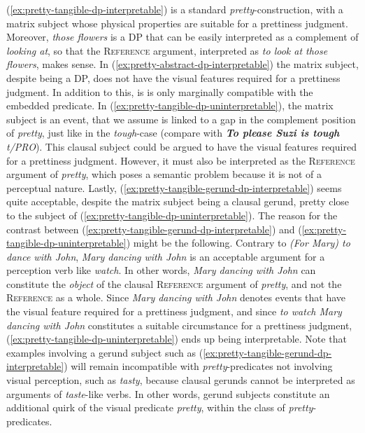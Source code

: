 \documentclass[11pt]{article}
\begin{document}
(\ref{ex:pretty-tangible-dp-interpretable}) is a standard \textit{pretty}-construction, with a matrix subject whose physical properties are suitable for a prettiness judgment. Moreover, \textit{those flowers} is a DP that can be easily interpreted as a complement of \textit{looking at}, so that the \textsc{Reference} argument, interpreted as \textit{to look at those flowers}, makes sense. In (\ref{ex:pretty-abstract-dp-interpretable}) the matrix subject, despite being a DP, does not have the visual features required for a prettiness judgment. In addition to this, is is only marginally compatible with the embedded predicate. In (\ref{ex:pretty-tangible-dp-uninterpretable}), the matrix subject is an event, that we assume is linked to a gap in the complement position of \textit{pretty}, just like in the \textit{tough}-case (compare with \textit{\textbf{To please Suzi is tough} t/PRO}). This clausal subject could be argued to have the visual features required for a prettiness judgment. However, it must also be interpreted as the \textsc{Reference} argument of \textit{pretty}, which poses a semantic problem because it is not of a perceptual nature. Lastly, (\ref{ex:pretty-tangible-gerund-dp-interpretable}) seems quite acceptable, despite the matrix subject being a clausal gerund, pretty close to the subject of (\ref{ex:pretty-tangible-dp-uninterpretable}). The reason for the contrast between (\ref{ex:pretty-tangible-gerund-dp-interpretable}) and (\ref{ex:pretty-tangible-dp-uninterpretable}) might be the following.  Contrary to \textit{(For Mary) to dance with John}, \textit{Mary dancing with John} is an acceptable argument for a perception verb like \textit{watch}. In other words, \textit{Mary dancing with John} can constitute the \textit{object} of the clausal \textsc{Reference} argument of \textit{pretty}, and not the \textsc{Reference} as a whole. Since  \textit{Mary dancing with John} denotes events that have the visual feature required for a prettiness judgment, and since \textit{to watch Mary dancing with John} constitutes a suitable circumstance for a prettiness judgment, (\ref{ex:pretty-tangible-dp-uninterpretable}) ends up being interpretable. Note that examples involving a gerund subject such as (\ref{ex:pretty-tangible-gerund-dp-interpretable}) will remain incompatible with \textit{pretty}-predicates not involving visual perception, such as \textit{tasty}, because clausal gerunds cannot be interpreted as arguments of \textit{taste}-like verbs. In other words, gerund subjects constitute an additional quirk of the visual predicate \textit{pretty}, within the class of \textit{pretty}-predicates.\\
\end{document}
